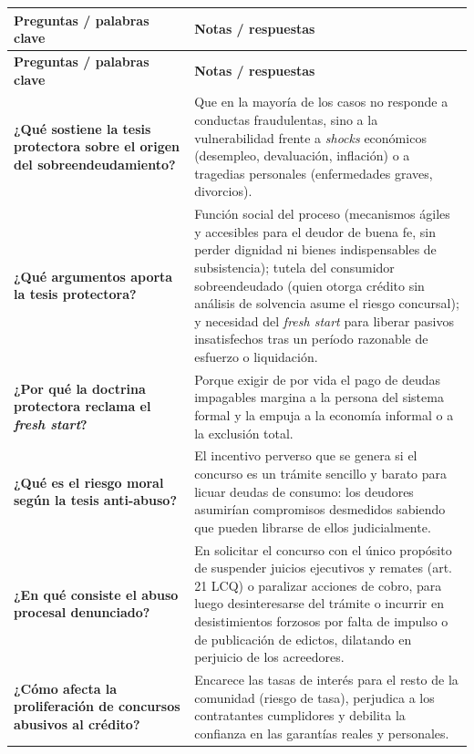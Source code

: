 \documentclass[12pt,oneside]{book}
\begin{document}
\begin{longtable}{
    >{\raggedright\arraybackslash}p{}
    >{\raggedright\arraybackslash}p{}
}
\toprule
\textbf{Preguntas / palabras clave} & \textbf{Notas / respuestas} \\
\midrule
\endfirsthead
\toprule
\textbf{Preguntas / palabras clave} & \textbf{Notas / respuestas} \\
\midrule
\endhead
\bottomrule
\endfoot

\textbf{¿Qué sostiene la tesis protectora sobre el origen del sobreendeudamiento?} &
Que en la mayoría de los casos no responde a conductas fraudulentas, sino a la vulnerabilidad frente a \textit{shocks} económicos (desempleo, devaluación, inflación) o a tragedias personales (enfermedades graves, divorcios). \\[0.6em]

\textbf{¿Qué argumentos aporta la tesis protectora?} &
Función social del proceso (mecanismos ágiles y accesibles para el deudor de buena fe, sin perder dignidad ni bienes indispensables de subsistencia); tutela del consumidor sobreendeudado (quien otorga crédito sin análisis de solvencia asume el riesgo concursal); y necesidad del \textit{fresh start} para liberar pasivos insatisfechos tras un período razonable de esfuerzo o liquidación. \\[0.6em]

\textbf{¿Por qué la doctrina protectora reclama el \textit{fresh start}?} &
Porque exigir de por vida el pago de deudas impagables margina a la persona del sistema formal y la empuja a la economía informal o a la exclusión total. \\[0.6em]

\textbf{¿Qué es el riesgo moral según la tesis anti-abuso?} &
El incentivo perverso que se genera si el concurso es un trámite sencillo y barato para licuar deudas de consumo: los deudores asumirían compromisos desmedidos sabiendo que pueden librarse de ellos judicialmente. \\[0.6em]

\textbf{¿En qué consiste el abuso procesal denunciado?} &
En solicitar el concurso con el único propósito de suspender juicios ejecutivos y remates (art. 21 LCQ) o paralizar acciones de cobro, para luego desinteresarse del trámite o incurrir en desistimientos forzosos por falta de impulso o de publicación de edictos, dilatando en perjuicio de los acreedores. \\[0.6em]

\textbf{¿Cómo afecta la proliferación de concursos abusivos al crédito?} &
Encarece las tasas de interés para el resto de la comunidad (riesgo de tasa), perjudica a los contratantes cumplidores y debilita la confianza en las garantías reales y personales. \\
\midrule


\end{longtable}
\end{document}

